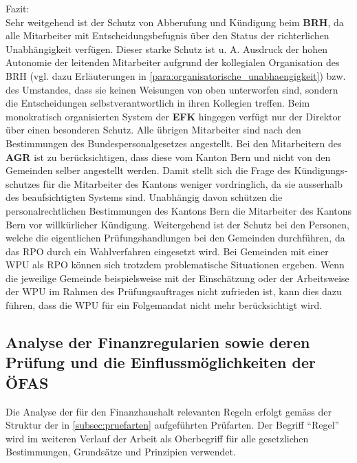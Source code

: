 \documentclass[10pt]{article}
\makeatletter
\renewcommand\paragraph{\@startsection{paragraph}{3}{0mm}{-\baselineskip}{.1\baselineskip}{\normalfont\normalsize\bfseries}}
\renewcommand\paragraph{%
\@startsection{paragraph}{3}{0mm}%
{-\baselineskip}%
{.1\baselineskip}%
{\normalfont\normalsize\bfseries}}
\makeatother
\begin{document}
Fazit:\\
Sehr weitgehend ist der Schutz von Abberufung und Kündigung beim \textbf{BRH}, da alle Mitarbeiter mit Entscheidungsbefugnis über den Status der richterlichen Unabhängigkeit verfügen. Dieser starke Schutz ist u. A. Ausdruck der hohen Autonomie der leitenden Mitarbeiter aufgrund der kollegialen Organisation des BRH (vgl. dazu Erläuterungen in \vref{para:organisatorische_unabhaengigkeit}) bzw. des Umstandes, dass sie keinen Weisungen von oben unterworfen sind, sondern die Entscheidungen selbstverantwortlich in ihren Kollegien treffen. Beim monokratisch organisierten System der \textbf{EFK} hingegen verfügt nur der Direktor über einen besonderen Schutz. Alle übrigen Mitarbeiter sind nach den Bestimmungen des Bundespersonalgesetzes angestellt. Bei den Mitarbeitern des \textbf{AGR} ist zu berücksichtigen, dass diese vom Kanton Bern und nicht von den Gemeinden selber angestellt werden. Damit stellt sich die Frage des Kündigungs­schutzes für die Mitarbeiter des Kantons weniger vordringlich, da sie ausserhalb des beaufsichtigten Systems sind. Unabhängig davon schützen die personalrechtlichen Bestimmungen des Kantons Bern die Mitarbeiter des Kantons Bern vor willkürlicher Kündigung. Weitergehend ist der Schutz bei den Personen, welche die eigentlichen Prüfungshandlungen bei den Gemeinden durchführen, da das RPO durch ein Wahlverfahren eingesetzt wird. Bei Gemeinden mit einer WPU als RPO können sich trotzdem problematische Situationen ergeben. Wenn die jeweilige Gemeinde beispielsweise mit der Einschätzung oder der Arbeitsweise der WPU im Rahmen des Prüfungsauftrages nicht zufrieden ist, kann dies dazu führen, dass die WPU für ein Folgemandat nicht mehr berücksichtigt wird.

\makeatletter
\renewcommand\paragraph{%
\@startsection{paragraph}{3}{0mm}%
{-\baselineskip}%
{.1\baselineskip}%
{\normalfont\normalsize\bfseries}}
\makeatother
\subsection{Analyse der Finanzregularien sowie deren Prüfung und die Einflussmöglichkeiten der ÖFAS}\label{subsec:analyse_der_finanzregularien_sowie_deren_pruefung_und_die_einflussmoeglichkeiten_der_ofas}
Die Analyse der für den Finanzhaushalt relevanten Regeln erfolgt gemäss der Struktur der in \vref{subsec:pruefarten} aufgeführten Prüfarten. Der Begriff “{}Regel”{} wird im weiteren Verlauf der Arbeit als Oberbegriff für alle gesetzlichen Bestimmungen, Grundsätze und Prinzipien verwendet.
\end{document}
